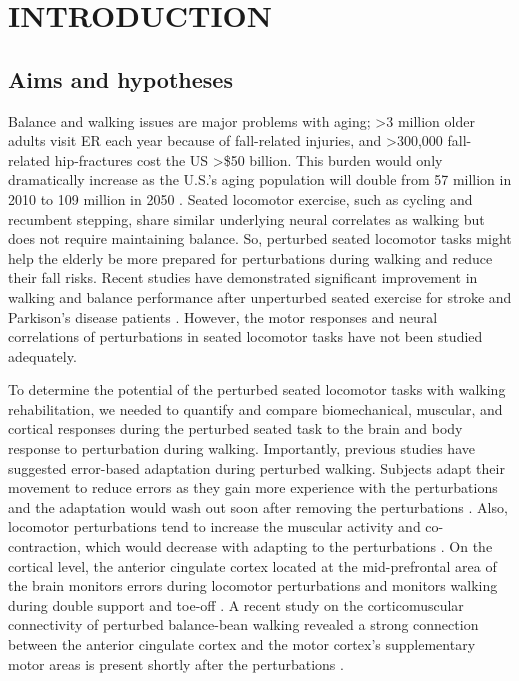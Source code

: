\documentclass[../thesis_seyed.tex]{subfiles}
\begin{document}
\chapter{INTRODUCTION}
\section{Aims and hypotheses}
Balance and walking issues are major problems with aging; >3 million older adults visit ER each year because of fall-related injuries, and >300,000 fall-related hip-fractures cost the US >\$50 billion. This burden would only dramatically increase as the U.S.'s aging population will double from 57 million in 2010 to 109 million in 2050 \cite{noauthor_undated-ql}. Seated locomotor exercise, such as cycling and recumbent stepping, share similar underlying neural correlates as walking \cite{Stoloff2007-da} but does not require maintaining balance. So, perturbed seated locomotor tasks might help the elderly be more prepared for perturbations during walking and reduce their fall risks. Recent studies have demonstrated significant improvement in walking and balance performance after unperturbed seated exercise for stroke and Parkison's disease patients \cite{Zhou2018-yy, Klarner2016-wh}. However, the motor responses and neural correlations of perturbations in seated locomotor tasks have not been studied adequately.

To determine the potential of the perturbed seated locomotor tasks with walking rehabilitation, we needed to quantify and compare biomechanical, muscular, and cortical responses during the perturbed seated task to the brain and body response to perturbation during walking. Importantly, previous studies have suggested error-based adaptation during perturbed walking. Subjects adapt their movement to reduce errors as they gain more experience with the perturbations and the adaptation would wash out soon after removing the perturbations \cite{Torres-Oviedo2011-tv}. Also, locomotor perturbations tend to increase the muscular activity and co-contraction, which would decrease with adapting to the perturbations \cite{Finley2013-lu, Acuna2019-lo}. On the cortical level, the anterior cingulate cortex located at the mid-prefrontal area of the brain monitors errors during locomotor perturbations \cite{Peterson2018-ht} and monitors walking during double support and toe-off \cite{Bradford2016-kp, Bulea2015-dv}. A recent study on the corticomuscular connectivity of perturbed balance-bean walking revealed a strong connection between the anterior cingulate cortex and the motor cortex's supplementary motor areas is present shortly after the perturbations \cite{Peterson2019-wz}.
\end{document}
